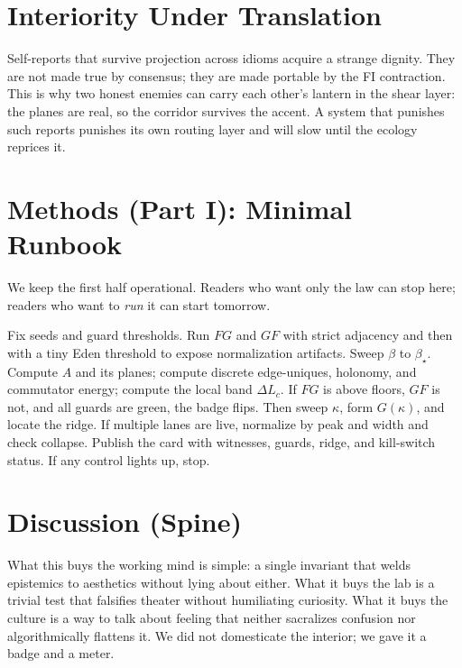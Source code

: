 \documentclass[11pt]{article}
\newcommand{\1}{\mathbf{1}}
\newcommand{\Lc}{L_c}
\newcommand{\Aanti}{A}  %
\newcommand{\Blur}{\beta}
\begin{document}
\section{Interiority Under Translation}
Self-reports that survive projection across idioms acquire a strange dignity. They are not made true by consensus; they are made portable by the FI contraction. This is why two honest enemies can carry each other's lantern in the shear layer: the planes are real, so the corridor survives the accent. A system that punishes such reports punishes its own routing layer and will slow until the ecology reprices it.

\section{Methods (Part I): Minimal Runbook}
We keep the first half operational. Readers who want only the law can stop here; readers who want to \emph{run} it can start tomorrow.

Fix seeds and guard thresholds. Run $FG$ and $GF$ with strict adjacency and then with a tiny Eden threshold to expose normalization artifacts. Sweep $\Blur$ to $\Blur_\star$. Compute $\Aanti$ and its planes; compute discrete edge-uniques, holonomy, and commutator energy; compute the local band $\Delta \Lc$. If $FG$ is above floors, $GF$ is not, and all guards are green, the badge flips. Then sweep $\kappa$, form $G(\kappa)$, and locate the ridge. If multiple lanes are live, normalize by peak and width and check collapse. Publish the card with witnesses, guards, ridge, and kill-switch status. If any control lights up, stop.

\section{Discussion (Spine)}
What this buys the working mind is simple: a single invariant that welds epistemics to aesthetics without lying about either. What it buys the lab is a trivial test that falsifies theater without humiliating curiosity. What it buys the culture is a way to talk about feeling that neither sacralizes confusion nor algorithmically flattens it. We did not domesticate the interior; we gave it a badge and a meter.


\end{document}
